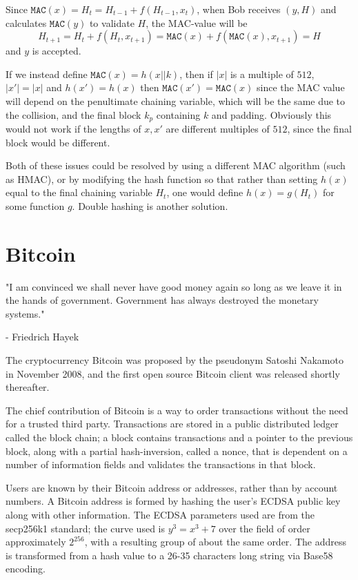 \documentclass[a4paper,12pt]{article}
\begin{document}
Since $\texttt{MAC}(x) = H_t = H_{t-1}+f(H_{t-1},x_t)$, when Bob receives $(y,H)$ and calculates $\texttt{MAC}(y)$ to validate $H$, the MAC-value will be $$H_{t+1} = H_t+f(H_t,x_{t+1}) = \texttt{MAC}(x)+f(\texttt{MAC}(x),x_{t+1}) = H$$
and $y$ is accepted.

If we instead define $\texttt{MAC}(x) = h(x||k)$, then if $|x|$ is a multiple of $512$, $|x'|=|x|$ and $h(x')=h(x)$ then $\texttt{MAC}(x') = \texttt{MAC}(x)$ since the MAC value will depend on the penultimate chaining variable, which will be the same due to the collision, and the final block $k_p$ containing $k$ and padding. Obviously this would not work if the lengths of $x,x'$ are different multiples of $512$, since the final block would be different. 

Both of these issues could be resolved by using a different MAC algorithm (such as HMAC), or by modifying the hash function so that rather than setting $h(x)$ equal to the final chaining variable $H_t$, one would define $h(x) = g(H_t)$ for some function $g$. Double hashing is another solution.

\newpage
\section{Bitcoin}

\epigraph{"I am convinced we shall never have good money again so long as we leave it in the hands of government. Government
has always destroyed the monetary systems."}{\textup{- Friedrich Hayek} }

The cryptocurrency Bitcoin was proposed by the pseudonym Satoshi Nakamoto in November 2008, and the first open source Bitcoin client was released shortly thereafter.

The chief contribution of Bitcoin is a way to order transactions without the need for a trusted third party.  Transactions are stored in a public distributed ledger called the block chain; a block contains transactions and a pointer to the previous block, along with a partial hash-inversion, called a nonce, that is dependent on a number of information fields and validates the transactions in that block. \cite[p. 11]{kobmen}

Users are known by their Bitcoin address or addresses, rather than by account numbers. A Bitcoin address is formed by hashing the user's ECDSA public key along with other information. \cite{address} The ECDSA parameters used are from the secp256k1 standard; the curve used is $y^3=x^3+7$ over the field of order approximately $2^{256}$, with a resulting group of about the same order. \cite{secp} The address is transformed from a hash value to a 26-35 characters long string via Base58 encoding.
\end{document}
